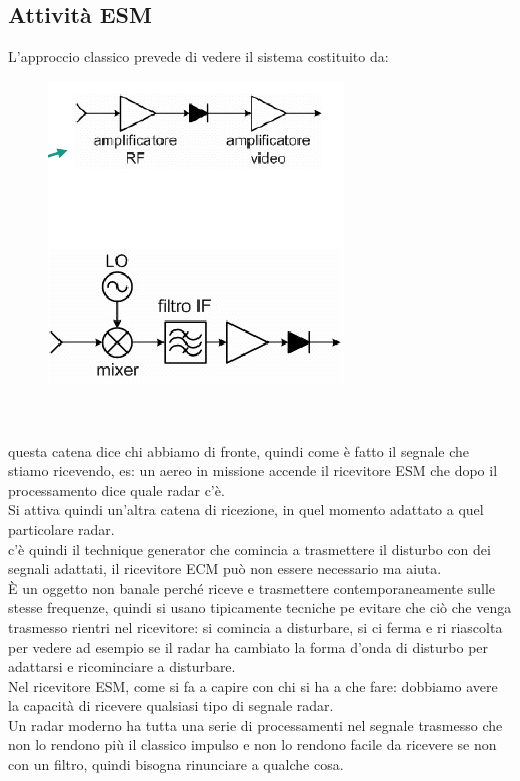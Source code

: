 \documentclass[oneside, 12pt]{extbook}
\begin{document}
\subsection{Attività ESM}
L'approccio classico prevede di vedere il sistema costituito da:\\
\begin{figure}[!h]
	\includegraphics[scale=0.6]{immagini/localization/esm-1.png}
\end{figure}\\\\
questa catena dice chi abbiamo di fronte, quindi come è fatto il segnale che stiamo ricevendo, es: un aereo in missione accende il ricevitore ESM che dopo il processamento dice quale radar c'è.\\
Si attiva quindi un'altra catena di ricezione, in quel momento adattato a quel particolare radar.\\
c'è quindi il technique generator che comincia a trasmettere il disturbo con dei segnali adattati, il ricevitore ECM può non essere necessario ma aiuta.\\
È un oggetto non banale perché riceve e trasmettere contemporaneamente sulle stesse frequenze, quindi si usano tipicamente tecniche pe evitare che ciò che venga trasmesso rientri nel ricevitore: si comincia a disturbare, si ci ferma e ri riascolta per vedere ad esempio se il radar ha cambiato la forma d'onda di disturbo per adattarsi e ricominciare a disturbare.\\
Nel ricevitore ESM, come si fa a capire con chi si ha a che fare: dobbiamo avere la capacità di ricevere qualsiasi tipo di segnale radar.\\
Un radar moderno ha tutta una serie di processamenti nel segnale trasmesso che non lo rendono più il classico impulso e non lo rendono facile da ricevere se non con un filtro, quindi bisogna rinunciare a qualche cosa.\\
\end{document}
